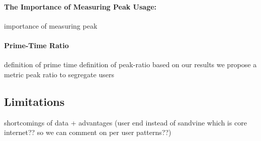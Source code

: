 \paragraph{The Importance of Measuring Peak Usage:}
 importance of measuring peak

\paragraph{Prime-Time Ratio} definition of prime time
definition of peak-ratio
based on our results we propose a metric peak ratio to segregate users

\subsection{Limitations}
 
 shortcomings of data + advantages (user end instead of sandvine which is core internet?? so we can comment on per user patterns??)